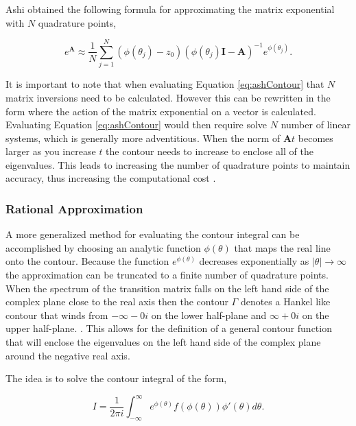 \noindent Ashi obtained the following formula for approximating the matrix exponential with $N$ quadrature points, 

\begin{equation}
    e^{\boldsymbol{A}} \approx \frac{1}{N}\sum_{j=1}^{N}(\phi(\theta_{j}) - z_{0})(\phi(\theta_{j})\boldsymbol{I} - \boldsymbol{A})^{-1}e^{\phi(\theta_{j})}.
    \label{eq:ashContour}
\end{equation}


It is important to note that when evaluating Equation \ref{eq:ashContour} that $N$ matrix inversions need to be calculated. However this can be rewritten in the form where the action of the matrix exponential on a vector is calculated. Evaluating Equation \ref{eq:ashContour} would then require solve $N$ number of linear systems, which is generally more adventitious. When the norm of $\boldsymbol{A}t$ becomes larger as you increase $t$ the contour needs to increase to enclose all of the eigenvalues. This leads to increasing the number of quadrature points to maintain accuracy, thus increasing the computational cost \cite{ash2009}. 

\subsubsection{Rational Approximation}
A more generalized method for evaluating the contour integral can be accomplished by choosing an analytic function $\phi(\theta)$ that maps the real line onto the contour. Because the function $e^{\phi(\theta)}$ decreases exponentially as $|\theta| \rightarrow \infty$ the approximation can be truncated to a finite number of quadrature points. When the spectrum of the transition matrix falls on the left hand side of the complex plane close to the real axis then the contour $\Gamma$ denotes a Hankel like contour that winds from $-\infty-0i$ on the lower half-plane and $\infty+0i$ on the upper half-plane. \cite{Trefethen2006}. This allows for the definition of a general contour function that will enclose the eigenvalues on the left hand side of the complex plane around the negative real axis. 

The idea is to solve the contour integral of the form,

\begin{equation}
    I = \frac{1}{2\pi i}\int_{-\infty}^{\infty}e^{\phi(\theta)}f(\phi(\theta))\phi'(\theta)d\theta.
    \label{eq:generalContourIntegral}
\end{equation}

